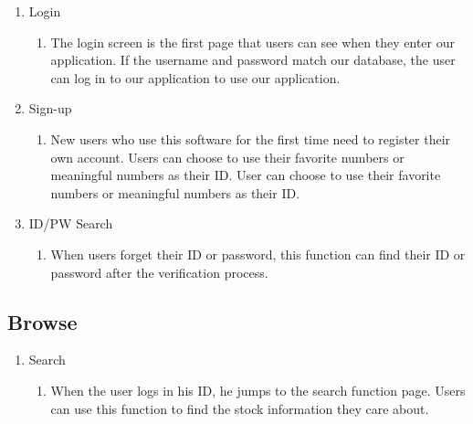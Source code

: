 \documentclass[conference]{IEEEtran}
\begin{document}
\begin{enumerate}
\item Login
    \begin{enumerate}
    \item  The login screen is the first page that users can see when they enter our application. If the username and password match our database, the user can log in to our application to use our application.
    \end{enumerate}
\item Sign-up
    \begin{enumerate}
    \item New users who use this software for the first time need to register their own account. Users can choose to use their favorite numbers or meaningful numbers as their ID. User can choose to use their favorite numbers or meaningful numbers as their ID.
    \end{enumerate}
\item  ID/PW Search
    \begin{enumerate}
    \item When users forget their ID or password, this function can find their ID or password after the verification process.
    \end{enumerate}    
\end{enumerate}
\subsection{Browse}    

\begin{enumerate}
\item Search
    \begin{enumerate}
    \item When the user logs in his ID, he jumps to the search function page. Users can use this function to find the stock information they care about.
    \end{enumerate}
\end{enumerate}
\end{document}
